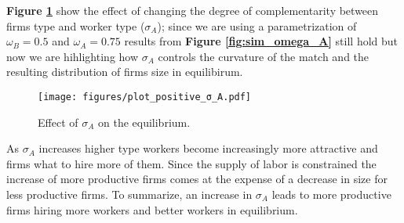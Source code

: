 \documentclass[12pt]{article}
\theoremstyle{definition}
\begin{document}
\textbf{Figure \ref{fig:sim_sigma_A}} show the effect of changing the degree of complementarity between firms type and worker type ($\sigma_A$); since we are using a parametrization of $\omega_B = 0.5$ and $\omega_A = 0.75$ results from \textbf{Figure \ref{fig:sim_omega_A}}  still hold but now we are hihlighting how $\sigma_A$ controls the curvature of the match and the resulting distribution of firms size in equilibirum.


\begin{figure}[h]
    \begin{center}
        \texttt{[image: figures/plot\_positive\_σ\_A.pdf]}
        \caption{Effect of $\sigma_A$ on the equilibrium.}
        \label{fig:sim_sigma_A}
    \end{center}
\end{figure}

As $\sigma_A$ increases higher type workers become increasingly more attractive and firms what to hire more of them. Since the supply of labor is constrained the increase of more productive firms comes at the expense of a decrease in size for less productive firms. To summarize, an increase in $\sigma_A$ leads to more productive firms hiring more workers and better workers in equilibrium.




% 
\end{document}
